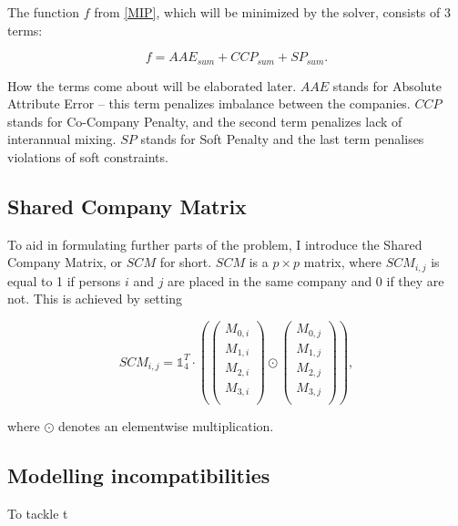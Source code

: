 \documentclass[11pt]{article}
\begin{document}
The function $f$ from \ref{MIP}, which will be minimized by the solver, consists of 3 terms:

\begin{equation}
    f = AAE_{sum} + CCP_{sum} + SP_{sum}.
\end{equation}

How the terms come about will be elaborated later.  $AAE$ stands for Absolute Attribute Error -- this term penalizes imbalance between the companies.  $CCP$
stands for Co-Company Penalty, and the second term penalizes lack of interannual mixing.  $SP$ stands for Soft Penalty and the last term penalises violations
of soft constraints.

\subsection{Shared Company Matrix}

To aid in formulating further parts of the problem, I introduce the Shared Company Matrix, or $SCM$ for short.  $SCM$ is a $p\times{}p$ matrix, where 
$SCM_{i,j}$ is equal to 1 if persons $i$ and $j$ are placed in the same company and 0 if they are not.  This is achieved by setting

\begin{equation}
    SCM_{i,j} = \mathbb{1}^{T}_4 \cdot 
    (
        \begin{pmatrix}
        M_{0,i} \\
        M_{1,i} \\
        M_{2,i} \\
        M_{3,i} \\
    \end{pmatrix}
\odot
    \begin{pmatrix}
    M_{0,j} \\
    M_{1,j} \\
    M_{2,j} \\
    M_{3,j} \\
    \end{pmatrix}
    ),
\end{equation}

where $\odot$ denotes an elementwise multiplication.

\subsection{Modelling incompatibilities}

To tackle t
\end{document}
